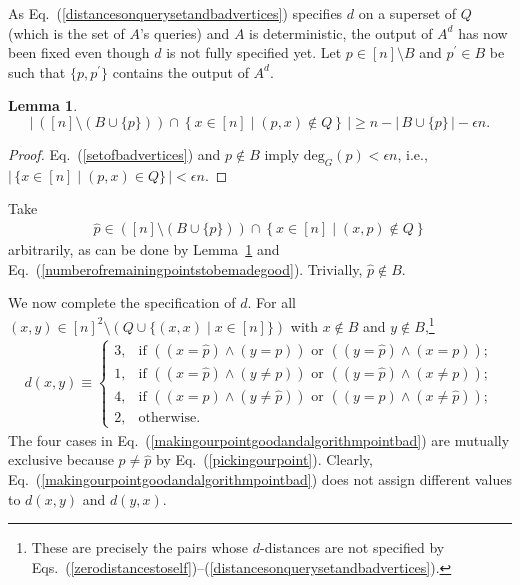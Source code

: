 \documentclass[letterpaper,12pt]{article}
\newtheorem{lemma}[theorem]{Lemma}
\newcommand{\comment}[1]{}
\begin{document}
{As
Eq.~(\ref{distancesonquerysetandbadvertices})
specifies
$d$ on a superset of $Q$ (which is the set of $A$'s queries)
and $A$ is deterministic,
the output of $A^d$
has
now
been
fixed
even though
$d$
is not fully specified yet.
Let
$p\in[n]\setminus B$ and $p^\prime\in B$
be
such that $\{p,p^\prime\}$ contains
the output of $A^d$.

\begin{lemma}\label{notbadandnotconnectedwithalgorithmoutput}
$$\left|\,\left([n]\setminus \left(B\cup\{p\}\right)\right)
\cap \left\{x\in[n]\mid (p,x)\notin Q\right\}\,\right|
\ge n-
\left|\,B\cup\{p\}\,\right|-\epsilon n.$$
\end{lemma}
\begin{proof}
Eq.~(\ref{setofbadvertices}) and $p\notin B$ imply $\text{deg}_G(p)<\epsilon
n$, i.e., $|\,\{x\in[n]\mid(p,x)\in Q\}\,|<\epsilon n$.
\end{proof}

\comment{\begin{eqnarray}
\hat{z}\equiv\left\{
\begin{array}[ll]
\mathop{argmin}_{y\in([n]\setminus B)\cap\{x\in[n]\mid (x,z)\notin Q\}}\,
\text{deg}_G(y),& \text{if }z\notin B;\\
\mathop{argmin}_{y\in[n]\setminus B}\, \text{deg}_G(y),& \text{otherwise}.
\end{array}
\right.
\label{nearoptimalpoint}
\end{eqnarray}
}
Take
\begin{eqnarray}
\hat{p}\in \left([n]\setminus \left(B\cup\{p\}\right)\right)
\cap\left\{x\in[n]\mid
\left(x,p\right)\notin Q\right\}
\label{pickingourpoint}
\end{eqnarray}
arbitrarily,
as
can be done
by
Lemma~\ref{notbadandnotconnectedwithalgorithmoutput}
and Eq.~(\ref{numberofremainingpointstobemadegood}).
Trivially, $\hat{p}\notin B$.

We now complete the specification of $d$.
For all $(x,y)\in [n]^2\setminus (Q\cup \{(x,x)\mid x\in[n]\})$ with $x\notin B$ and $y\notin
B$,\footnote{These are precisely the pairs whose $d$-distances are not
specified by
Eqs.~(\ref{zerodistancestoself})--(\ref{distancesonquerysetandbadvertices}).}
\begin{eqnarray}
d(x,y)\equiv\left\{
\begin{array}{ll}
3,& \text{if }
((x=\hat{p})\land (y= p))\text{ or }((y=\hat{p})\land (x=p));\\
1, & \text{if }((x=\hat{p})\land (y\neq p))\text{ or }((y=\hat{p})\land (x\neq
p));\\
4, &\text{if }((x=p)\land(y\neq \hat{p}))\text{ or }((y=p)\land(x\neq\hat{p}));\\
2, &\text{otherwise}.
\end{array}
\right.
\label{makingourpointgoodandalgorithmpointbad}
\end{eqnarray}
The four cases
in Eq.~(\ref{makingourpointgoodandalgorithmpointbad})
are mutually exclusive because $p\neq \hat{p}$ by
Eq.~(\ref{pickingourpoint}).
Clearly, Eq.~(\ref{makingourpointgoodandalgorithmpointbad}) does not assign
different values to $d(x,y)$ and $d(y,x)$.

}
\end{document}
